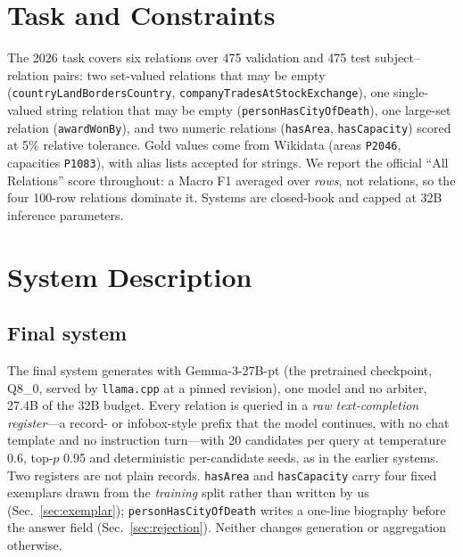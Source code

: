 \documentclass[11pt]{article}
\begin{document}
\section{Task and Constraints}

The 2026 task covers six relations over 475 validation and 475 test
subject--relation pairs: two set-valued relations that may be empty
(\texttt{countryLandBordersCountry},
\texttt{companyTradesAtStockExchange}), one single-valued string relation
that may be empty (\texttt{personHasCityOfDeath}), one large-set relation
(\texttt{awardWonBy}), and two numeric relations (\texttt{hasArea},
\texttt{hasCapacity}) scored at 5\% relative tolerance. Gold values come
from Wikidata (areas \texttt{P2046}, capacities \texttt{P1083}), with
alias lists accepted for strings. We report the official ``All
Relations'' score throughout: a Macro F1 averaged over \emph{rows}, not
relations, so the four 100-row relations dominate it. Systems are
closed-book and capped at 32B inference parameters.

\section{System Description}
\label{sec:system}

\subsection{Final system}

The final system generates with Gemma-3-27B-pt (the pretrained
checkpoint, Q8\_0, served by \texttt{llama.cpp} at a pinned revision),
one model and no arbiter, 27.4B of the 32B budget. Every relation is
queried in a \emph{raw text-completion register}---a record- or
infobox-style prefix that the model continues, with no chat template and
no instruction turn---with 20 candidates per query at temperature 0.6,
top-$p$ 0.95 and deterministic per-candidate seeds, as in the earlier
systems. Two registers are not plain records. \texttt{hasArea} and
\texttt{hasCapacity} carry four fixed exemplars drawn from the
\emph{training} split rather than written by us
(Sec.~\ref{sec:exemplar}); \texttt{personHasCityOfDeath} writes a
one-line biography before the answer field (Sec.~\ref{sec:rejection}).
Neither changes generation or aggregation otherwise.
\end{document}
